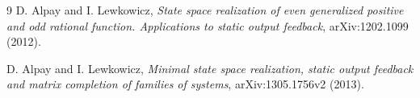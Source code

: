 \documentclass[11pt]{article}
\begin{document}
\begin{thebibliography}{9}
D. Alpay and I. Lewkowicz,
\emph{State space realization of even generalized positive and odd rational
function. Applications to static output feedback}, arXiv:1202.1099 (2012).

D. Alpay and I. Lewkowicz,
\emph{Minimal state space realization, static output feedback and matrix
completion of families of systems}, arXiv:1305.1756v2 (2013).
\end{thebibliography}
\end{document}
